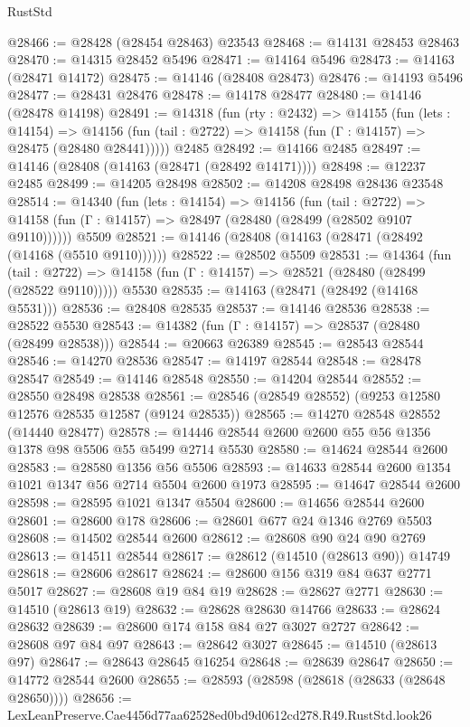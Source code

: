 \begin{lexlean}{RustStd}
\begin{coremodule}
@28466 := @28428 (@28454 @28463) @23543
@28468 := @14131 @28453 @28463
@28470 := @14315 @28452 @5496
@28471 := @14164 @5496
@28473 := @14163 (@28471 @14172)
@28475 := @14146 (@28408 @28473)
@28476 := @14193 @5496
@28477 := @28431 @28476
@28478 := @14178 @28477
@28480 := @14146 (@28478 @14198)
@28491 := @14318
    (fun (rty : @2432) =>
    @14155
      (fun (lets : @14154) =>
      @14156 (fun (tail : @2722) => @14158 (fun (Γ : @14157) => @28475 (@28480 @28441)))))
    @2485
@28492 := @14166 @2485
@28497 := @14146 (@28408 (@14163 (@28471 (@28492 @14171))))
@28498 := @12237 @2485
@28499 := @14205 @28498
@28502 := @14208 @28498 @28436 @23548
@28514 := @14340
    (fun (lets : @14154) =>
    @14156
      (fun (tail : @2722) =>
      @14158 (fun (Γ : @14157) => @28497 (@28480 (@28499 (@28502 @9107 @9110))))))
    @5509
@28521 := @14146 (@28408 (@14163 (@28471 (@28492 (@14168 (@5510 @9110))))))
@28522 := @28502 @5509
@28531 := @14364
    (fun (tail : @2722) => @14158 (fun (Γ : @14157) => @28521 (@28480 (@28499 (@28522 @9110)))))
    @5530
@28535 := @14163 (@28471 (@28492 (@14168 @5531)))
@28536 := @28408 @28535
@28537 := @14146 @28536
@28538 := @28522 @5530
@28543 := @14382 (fun (Γ : @14157) => @28537 (@28480 (@28499 @28538)))
@28544 := @20663 @26389
@28545 := @28543 @28544
@28546 := @14270 @28536
@28547 := @14197 @28544
@28548 := @28478 @28547
@28549 := @14146 @28548
@28550 := @14204 @28544
@28552 := @28550 @28498 @28538
@28561 := @28546 (@28549 @28552) (@9253 @12580 @12576 @28535 @12587 (@9124 @28535))
@28565 := @14270 @28548 @28552 (@14440 @28477)
@28578 := @14446 @28544 @2600 @2600 @55 @56 @1356 @1378 @98 @5506 @55 @5499 @2714 @5530
@28580 := @14624 @28544 @2600
@28583 := @28580 @1356 @56 @5506
@28593 := @14633 @28544 @2600 @1354 @1021 @1347 @56 @2714 @5504 @2600 @1973
@28595 := @14647 @28544 @2600
@28598 := @28595 @1021 @1347 @5504
@28600 := @14656 @28544 @2600
@28601 := @28600 @178
@28606 := @28601 @677 @24 @1346 @2769 @5503
@28608 := @14502 @28544 @2600
@28612 := @28608 @90 @24 @90 @2769
@28613 := @14511 @28544
@28617 := @28612 (@14510 (@28613 @90)) @14749
@28618 := @28606 @28617
@28624 := @28600 @156 @319 @84 @637 @2771 @5017
@28627 := @28608 @19 @84 @19
@28628 := @28627 @2771
@28630 := @14510 (@28613 @19)
@28632 := @28628 @28630 @14766
@28633 := @28624 @28632
@28639 := @28600 @174 @158 @84 @27 @3027 @2727
@28642 := @28608 @97 @84 @97
@28643 := @28642 @3027
@28645 := @14510 (@28613 @97)
@28647 := @28643 @28645 @16254
@28648 := @28639 @28647
@28650 := @14772 @28544 @2600
@28655 := @28593 (@28598 (@28618 (@28633 (@28648 @28650))))
@28656 := LexLeanPreserve.Cae4456d77aa62528ed0bd9d0612cd278.R49.RustStd.look26

\end{coremodule}
\end{lexlean}
